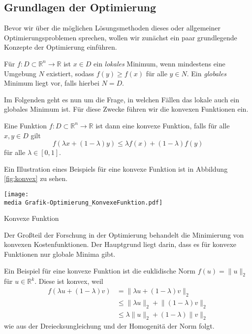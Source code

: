 \subsection{Grundlagen der Optimierung}

Bevor wir \"uber die m\"oglichen L\"osungsmethoden dieses oder allgemeiner Optimierungsproblemen sprechen, wollen wir zun\"achst ein paar grundlegende Konzepte der Optimierung einf\"uhren. 


\begin{Def}
Für $f: D \subset \mathbb{R}^n \rightarrow \mathbb{R}$ ist $x\in D$ ein \emph{lokales} Minimum, wenn mindestens eine Umgebung $N$ existiert, sodass $f(y)\geq f(x)$ für alle $y\in N$.
Ein \emph{globales} Minimum liegt vor, falls hierbei $N=D$.
\end{Def}

Im Folgenden geht es nun um die Frage, in welchen F\"allen das lokale auch ein globales Minimum ist. F\"ur diese Zwecke f\"uhren wir die konvexen Funktionen ein.

\begin{Def}
Eine Funktion $f: D\subset \mathbb{R}^n\rightarrow\mathbb{R}$ ist dann eine konvexe Funktion, falls für alle $x, y\in D$ gilt
\begin{equation*}
  f(\lambda x+ (1 - \lambda)y) \leq \lambda f(x)+(1-\lambda)f(y)
\end{equation*}
für alle $\lambda \in [0, 1]$.
\end{Def}

Ein Illustration eines Beispiels f\"ur eine konvexe Funktion ist in Abbildung \ref{fig:konvex} zu sehen. 
 \begin{dsafigure}
 \begin{center}
 \texttt{[image: \\media Grafik-Optimierung\_KonvexeFunktion.pdf]}
 \caption{Konvexe Funktion}
 \label{fig:konvex}
 \end{center}
\end{dsafigure}
Der Gro\ss teil der Forschung in der Optimierung behandelt die Minimierung von konvexen Kostenfunktionen. Der Hauptgrund liegt darin, dass es f\"ur konvexe Funktionen nur globale Minima gibt. 


\begin{Bsp}
Ein Beispiel für eine konvexe Funktion ist die euklidische Norm $f(u) = \lVert u\rVert_2$ für $u\in\mathbb{R}^k$. Diese ist konvex, weil
\begin{align*}
f(\lambda u+(1-\lambda)v) &=\lVert\lambda u+(1-\lambda)v\rVert_2\\
&\leq\lVert\lambda u\rVert_2+\lVert(1-\lambda)v\rVert_2\\
&\leq\lambda\lVert u\rVert_2+(1-\lambda)\lVert v\rVert_2
\end{align*}
wie aus der Dreiecksungleichung und der Homogenit\"a der Norm folgt.
\end{Bsp}
